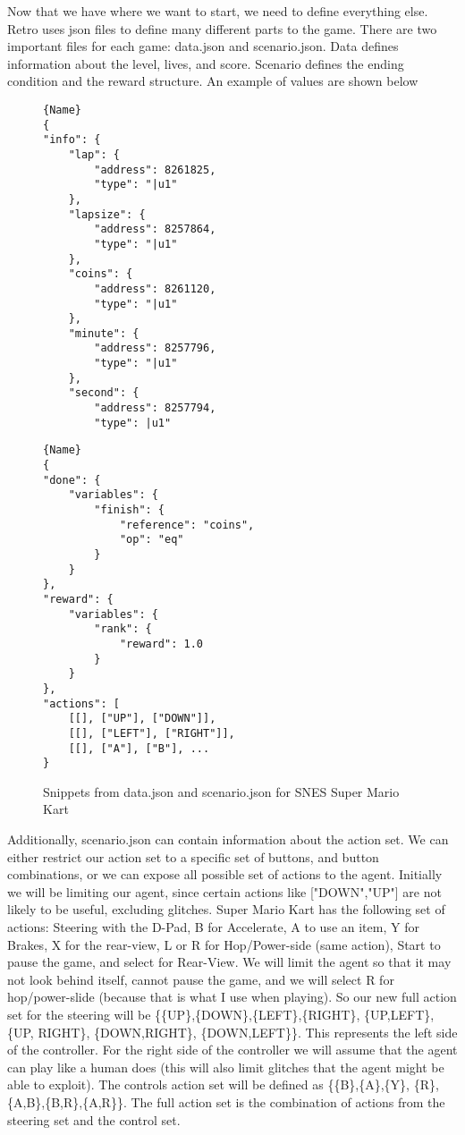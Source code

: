 \documentclass[12pt,letter]{article}
\begin{document}
Now that we have where we want to start, we need to define everything else.  
Retro uses json files to define many different parts to the game. There are 
two important files for each game: data.json and scenario.json. Data defines
information about the level, lives, and score. Scenario defines the
ending condition and the reward structure. An example of values are shown
below
\\
\begin{figure}[h!]
\begin{minipage}{0.47\textwidth}
    \begin{lstlisting}[caption=data.json, frame=tlrb]{Name}
{
"info": {
    "lap": {
        "address": 8261825,
        "type": "|u1"
    },
    "lapsize": {
        "address": 8257864,
        "type": "|u1"
    },
    "coins": {
        "address": 8261120,
        "type": "|u1"
    },
    "minute": {
        "address": 8257796,
        "type": "|u1"
    },
    "second": {
        "address": 8257794,
        "type": |u1"
    \end{lstlisting}
\end{minipage}\hfill
\begin{minipage}{0.47\textwidth}
    \begin{lstlisting}[caption=scenario.json, frame=tlrb]{Name}
{
"done": {
    "variables": {
        "finish": {
            "reference": "coins",
            "op": "eq"
        }
    }
},
"reward": {
    "variables": {
        "rank": {
            "reward": 1.0
        }
    }
},
"actions": [
    [[], ["UP"], ["DOWN"]],
    [[], ["LEFT"], ["RIGHT"]],
    [[], ["A"], ["B"], ...
}
    \end{lstlisting}
\end{minipage}
    \caption{Snippets from data.json and scenario.json for SNES Super Mario Kart}
\end{figure}
Additionally, scenario.json can contain information about the action set. We can
either restrict our action set to a specific set of buttons, and button 
combinations, or we can expose all possible set of actions to the agent. Initially
we will be limiting our agent, since certain actions like ["DOWN","UP"] are
not likely to be useful, excluding glitches. Super Mario Kart has the following
set of actions: Steering with the D-Pad, B for Accelerate, A to use an item, 
Y for Brakes, X for the rear-view, L or R for Hop/Power-side (same action), 
Start to pause the game, and select for Rear-View. We will limit the agent
so that it may not look behind itself, cannot pause the game, and we will select
R for hop/power-slide (because that is what I use when playing). So our new full
action set for the steering will be \{\{UP\},\{DOWN\},\{LEFT\},\{RIGHT\},
\{UP,LEFT\}, \{UP, RIGHT\}, \{DOWN,RIGHT\}, \{DOWN,LEFT\}\}. 
This represents the left side of the controller. For the right side of the 
controller we will assume that the agent can play like a human does 
(this will also limit glitches that the agent might be able to exploit). 
The controls action set will be defined as \{\{B\},\{A\},\{Y\},
\{R\},\{A,B\},\{B,R\},\{A,R\}\}. The full action set is the combination of 
actions from the steering set and the control set. 
\end{document}
